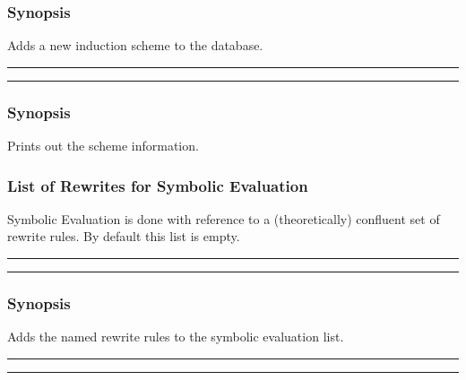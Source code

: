 
\subsubsection*{Synopsis}
Adds a new induction scheme to the database.

\vspace{2mm}
\hrule
\vspace{2mm}
\begin{Large}
\end{Large}
\vspace{2mm}
\hrule
\vspace{2mm}


\subsubsection*{Synopsis}
Prints out the scheme information.

\subsubsection{List of Rewrites for Symbolic Evaluation}
Symbolic Evaluation is done with reference to a (theoretically)
confluent set of rewrite rules.  By default this list is empty.

\vspace{2mm}
\hrule
\vspace{2mm}
\begin{Large}
\end{Large}
\vspace{2mm}
\hrule
\vspace{2mm}


\subsubsection*{Synopsis}
Adds the named rewrite rules to the symbolic evaluation
list.

\vspace{2mm}
\hrule
\vspace{2mm}
\begin{Large}
\end{Large}
\vspace{2mm}
\hrule
\vspace{2mm}

